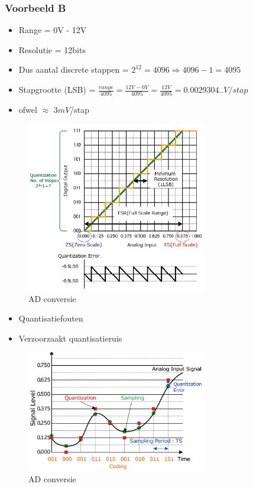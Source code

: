 \documentclass{article}
\begin{document}
\subsubsection{Voorbeeld B}
\begin{itemize}
    \item Range = 0V - 12V
    \item Resolutie = 12bits
    \item Dus aantal discrete stappen = $2^{12} = 4096 \Rightarrow 4096 - 1 = 4095$
    \item Stapgrootte (LSB) = $\frac{range}{4095} = \frac{12V - 0V}{4095} = \frac{12V}{4095} = 0.0029304..V / stap$
    \item ofwel $\approx$ $3mV$/stap
\end{itemize}


\begin{figure}[H]
    \centering
    \includegraphics[width=0.7\textwidth]{Screenshot_20200224_120800.jpg}
    \caption{AD conversie}
\end{figure}

\begin{itemize}
    \item Quantisatiefouten
    \item Verzoorzaakt quantisatieruis
\end{itemize}

\begin{figure}[H]
    \centering
    \includegraphics[width=0.7\textwidth]{Screenshot_20200224_120900.jpg}
    \caption{AD conversie}
\end{figure}
\end{document}

